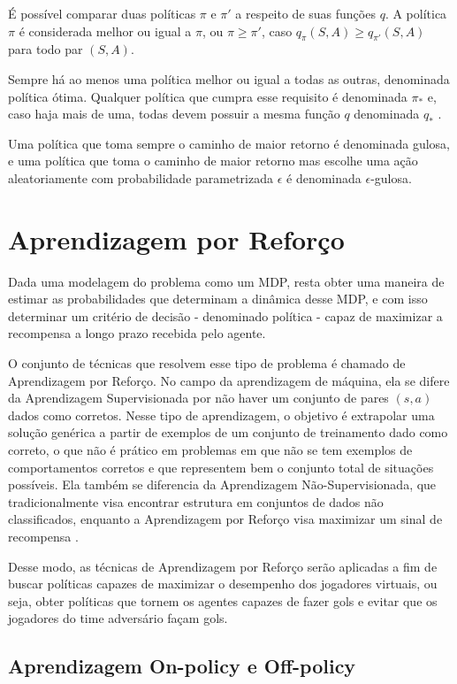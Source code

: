 É possível comparar duas políticas $\pi$ e $\pi'$ a respeito de suas funções $q$. A política $\pi$ é considerada melhor ou igual a $\pi$, ou $\pi \ge \pi'$, caso $q_\pi(S, A) \ge q_{\pi'}(S, A)$ para todo par $(S, A)$.

Sempre há ao menos uma política melhor ou igual a todas as outras, denominada política ótima. Qualquer política que cumpra esse requisito é denominada $\pi_*$ e, caso haja mais de uma, todas devem possuir a mesma função $q$ denominada $q_*$ \cite{sutton2018reinforcement}. %

Uma política que toma sempre o caminho de maior retorno é denominada gulosa, e uma política que toma o caminho de maior retorno mas escolhe uma ação aleatoriamente com probabilidade parametrizada $\epsilon$ é denominada $\epsilon$-gulosa.

\section{Aprendizagem por Reforço}

Dada uma modelagem do problema como um MDP, resta obter uma maneira de estimar as probabilidades que determinam a dinâmica desse MDP, e com isso determinar um critério de decisão - denominado política - capaz de maximizar a recompensa a longo prazo recebida pelo agente.

O conjunto de técnicas que resolvem esse tipo de problema é chamado de Aprendizagem por Reforço.
No campo da aprendizagem de máquina, ela se difere da Aprendizagem Supervisionada por não haver um conjunto de pares $(s, a)$ dados como corretos.
Nesse tipo de aprendizagem, o objetivo é extrapolar uma solução genérica a partir de exemplos de um conjunto de treinamento dado como correto, o que não é prático em problemas em que não se tem exemplos de comportamentos corretos e que representem bem o conjunto total de situações possíveis.
Ela também se diferencia da Aprendizagem Não-Supervisionada, que tradicionalmente visa encontrar estrutura em conjuntos de dados não classificados, enquanto a Aprendizagem por Reforço visa maximizar um sinal de recompensa \cite{sutton2018reinforcement}.

Desse modo, as técnicas de Aprendizagem por Reforço serão aplicadas a fim de buscar políticas capazes de maximizar o desempenho dos jogadores virtuais, ou seja, obter políticas que tornem os agentes capazes de fazer gols e evitar que os jogadores do time adversário façam gols.

\subsection{Aprendizagem On-policy e Off-policy}

